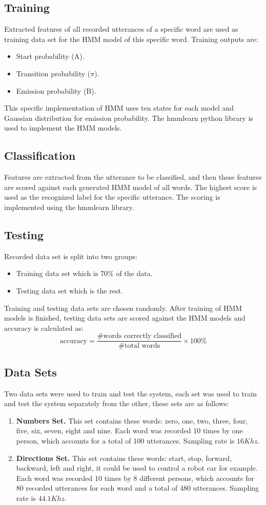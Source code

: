 \documentclass[12pt, a4paper, twoside]{report}
\begin{document}
\subsection{Training}
Extracted features of all recorded utterances of a specific word are used as training data set for the HMM model of this specific word. Training outputs are:
\begin{itemize}[noitemsep]
\item Start probability (A).
\item Transition probability ($\pi$).
\item Emission probability (B).
\end{itemize}
This specific implementation of HMM uses ten states for each model and Gaussian distribution for emission probability. The hmmlearn python library is used to implement the HMM models.
\subsection{Classification}
Features are extracted from the utterance to be classified, and then these features are scored against each generated HMM model of all words. The highest score is used as the recognized label for the specific utterance. The scoring is implemented using the hmmlearn library.
\subsection{Testing}
Recorded data set is split into two groups:
\begin{itemize}[noitemsep]
\item Training data set which is 70\% of the data.
\item Testing data set which is the rest.
\end{itemize}
Training and testing data sets are chosen randomly. After training of HMM models is finished, testing data sets are scored against the HMM models and accuracy is calculated as:
\begin{equation*}
\text{accuracy} = \frac{\text{\# words correctly classified}}{\text{\# total words}} \times 100\%
\end{equation*}

\subsection{Data Sets}
Two data sets were used to train and test the system, each set was used to train and test the system separately from the other, these sets are as follows:
\begin{enumerate}[noitemsep]
\item \textbf{Numbers Set.} This set contains these words: zero, one, two, three, four, five, six, seven, eight and nine. Each word was recorded 10 times by one person, which accounts for a total of 100 utterances. Sampling rate is $16Khz$.
\item \textbf{Directions Set.} This set contains these words: start, stop, forward, backward, left and right, it could be used to control a robot car for example. Each word was recorded 10 times by 8 different persons, which accounts for 80 recorded utterances for each word and a total of 480 utterances. Sampling rate is $44.1Khz$.
\end{enumerate}
\end{document}
